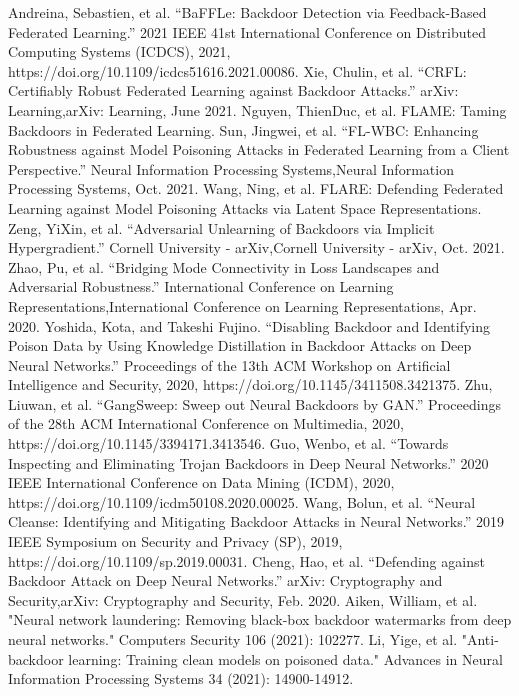\documentclass[conference]{IEEEtran}
\begin{document}
\begin{thebibliography}{00}
     Andreina, Sebastien, et al. “BaFFLe: Backdoor Detection via Feedback-Based Federated Learning.” 2021 IEEE 41st International Conference on Distributed Computing Systems (ICDCS), 2021, https://doi.org/10.1109/icdcs51616.2021.00086.
     Xie, Chulin, et al. “CRFL: Certifiably Robust Federated Learning against Backdoor Attacks.” arXiv: Learning,arXiv: Learning, June 2021.  
     Nguyen, ThienDuc, et al. FLAME: Taming Backdoors in Federated Learning.  
     Sun, Jingwei, et al. “FL-WBC: Enhancing Robustness against Model Poisoning Attacks in Federated Learning from a Client Perspective.” Neural Information Processing Systems,Neural Information Processing Systems, Oct. 2021.  
     Wang, Ning, et al. FLARE: Defending Federated Learning against Model Poisoning Attacks via Latent Space Representations.
     Zeng, YiXin, et al. “Adversarial Unlearning of Backdoors via Implicit Hypergradient.” Cornell University - arXiv,Cornell University - arXiv, Oct. 2021.  
     Zhao, Pu, et al. “Bridging Mode Connectivity in Loss Landscapes and Adversarial Robustness.” International Conference on Learning Representations,International Conference on Learning Representations, Apr. 2020.
     Yoshida, Kota, and Takeshi Fujino. “Disabling Backdoor and Identifying Poison Data by Using Knowledge Distillation in Backdoor Attacks on Deep Neural Networks.” Proceedings of the 13th ACM Workshop on Artificial Intelligence and Security, 2020, https://doi.org/10.1145/3411508.3421375.
     Zhu, Liuwan, et al. “GangSweep: Sweep out Neural Backdoors by GAN.” Proceedings of the 28th ACM International Conference on Multimedia, 2020, https://doi.org/10.1145/3394171.3413546.  
     Guo, Wenbo, et al. “Towards Inspecting and Eliminating Trojan Backdoors in Deep Neural Networks.” 2020 IEEE International Conference on Data Mining (ICDM), 2020, https://doi.org/10.1109/icdm50108.2020.00025.
     Wang, Bolun, et al. “Neural Cleanse: Identifying and Mitigating Backdoor Attacks in Neural Networks.” 2019 IEEE Symposium on Security and Privacy (SP), 2019, https://doi.org/10.1109/sp.2019.00031.
     Cheng, Hao, et al. “Defending against Backdoor Attack on Deep Neural Networks.” arXiv: Cryptography and Security,arXiv: Cryptography and Security, Feb. 2020. 
     Aiken, William, et al. "Neural network laundering: Removing black-box backdoor watermarks from deep neural networks." Computers  Security 106 (2021): 102277.
     Li, Yige, et al. "Anti-backdoor learning: Training clean models on poisoned data." Advances in Neural Information Processing Systems 34 (2021): 14900-14912.

\end{thebibliography}
\end{document}
